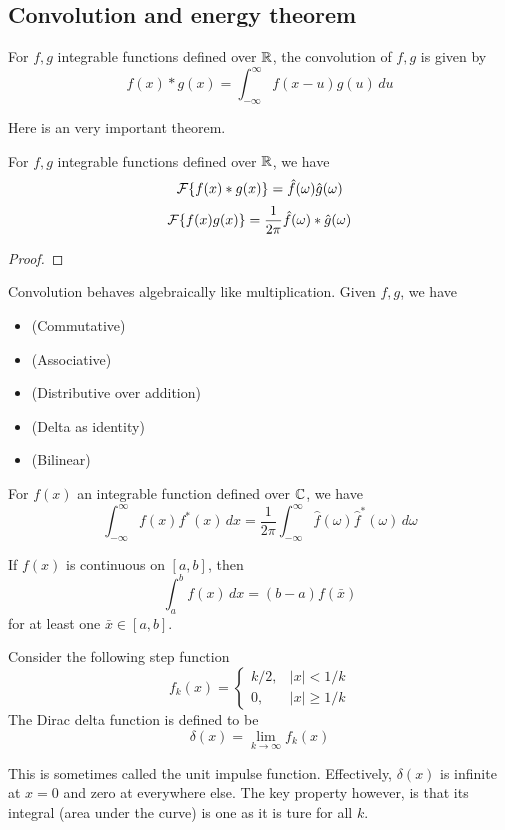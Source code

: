\documentclass[11pt]{article}
\begin{document}
\subsection{Convolution and energy theorem}
\begin{definition}[Convolution]
  For \(f,g\) integrable functions defined over \(\R\), the convolution of \(f,g\) is given by
  \[f(x)*g(x)=\int_{-\infty}^{\infty}f(x-u)g(u)\,du\]
\end{definition}

Here is an very important theorem.
\begin{theorem}
  For \(f,g\) integrable functions defined over \(\R\), we have
  \[\cal{F}\{f(x)*g(x)\}=\hat{f}(\omega)\hat{g}(\omega)\]
  \[\cal{F}\{f(x)g(x)\}=\frac{1}{2\pi}\hat{f}(\omega)*\hat{g}(\omega)\]
\end{theorem}
\begin{proof}
  
\end{proof}

\begin{proposition}
  Convolution behaves algebraically like multiplication. Given \(f,g\), we have
  \begin{itemize}
    \item (Commutative)
    \item (Associative)
    \item (Distributive over addition)
    \item (Delta as identity)
    \item (Bilinear)
  \end{itemize}
\end{proposition}

\begin{theorem}
  For \(f(x)\) an integrable function defined over \(\C\), we have
  \[\int_{-\infty}^{\infty}f(x)f^*(x)\,dx=\frac{1}{2\pi}\int_{-\infty}^{\infty} \hat{f}(\omega)\hat{f}^*(\omega)\,d\omega\]
\end{theorem}

\begin{theorem}
  If \(f(x)\) is continuous on \([a,b]\), then 
  \[\int_{a}^{b}f(x)\,dx=(b-a)f(\bar{x})\]
  for at least one \(\bar{x}\in[a,b]\).
\end{theorem}

\begin{definition}
  Consider the following step function
  \[f_k(x)=\begin{cases}
    k/2, & |x|<1/k\\
    0, & |x|\geq 1/k
  \end{cases}\]
  The Dirac delta function is defined to be
  \[\delta(x)=\lim_{k\to\infty}f_k(x)\]
\end{definition}
This is sometimes called the unit impulse function. Effectively, \(\delta(x)\) is infinite at \(x=0\) and zero at everywhere else. The key property however, is that its integral (area under the curve) is one as it is ture for all \(k\).
\end{document}
